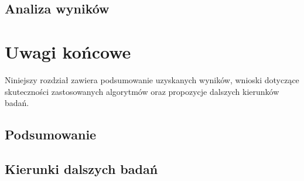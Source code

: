 \documentclass[polish,master,a4paper,oneside]{ppfcmthesis}
\begin{document}
\section{Analiza wyników}
\label{sec:analiza}


\chapter{Uwagi końcowe}

Niniejszy rozdział zawiera podsumowanie uzyskanych wyników, wnioski
dotyczące skuteczności zastosowanych algorytmów oraz propozycje
dalszych kierunków badań.

\section{Podsumowanie}
\label{sec:podsumowanie}
 

\section{Kierunki dalszych badań}
\label{sec:dalsze_badania}


{\raggedright\sloppy\small}

\ppcolophon
\end{document}
